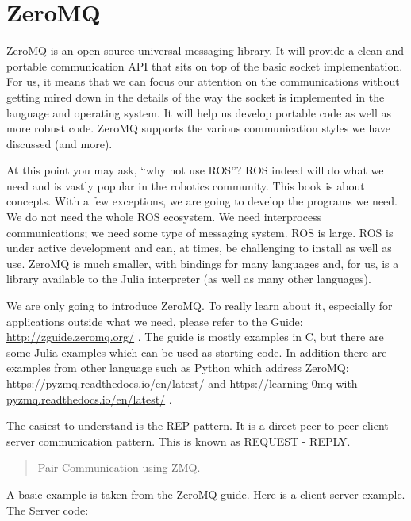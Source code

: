 \hypertarget{zeromq}{%
\section{ZeroMQ}\label{zeromq}}

ZeroMQ is an open-source universal messaging library. It will provide a
clean and portable communication API that sits on top of the basic
socket implementation. For us, it means that we can focus our attention
on the communications without getting mired down in the details of the
way the socket is implemented in the language and operating system. It
will help us develop portable code as well as more robust code. ZeroMQ
supports the various communication styles we have discussed (and more).

At this point you may ask, ``why not use ROS''? ROS indeed will do what
we need and is vastly popular in the robotics community. This book is
about concepts. With a few exceptions, we are going to develop the
programs we need. We do not need the whole ROS ecosystem. We need
interprocess communications; we need some type of messaging system. ROS
is large. ROS is under active development and can, at times, be
challenging to install as well as use. ZeroMQ is much smaller, with
bindings for many languages and, for us, is a library available to the
Julia interpreter (as well as many other languages).

We are only going to introduce ZeroMQ. To really learn about it,
especially for applications outside what we need, please refer to the
Guide: \url{http://zguide.zeromq.org/} . The guide is mostly examples in
C, but there are some Julia examples which can be used as starting code.
In addition there are examples from other language such as Python which
address ZeroMQ: \url{https://pyzmq.readthedocs.io/en/latest/} and
\url{https://learning-0mq-with-pyzmq.readthedocs.io/en/latest/} .

The easiest to understand is the REP pattern. It is a direct peer to
peer client server communication pattern. This is known as REQUEST -
REPLY.

\begin{quote}
Pair Communication using ZMQ.
\end{quote}

A basic example is taken from the ZeroMQ guide. Here is a client server
example. The Server code:

